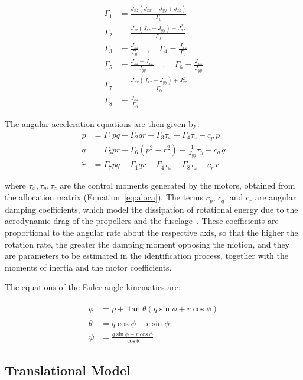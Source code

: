 \documentclass{ieeeaccess}
\begin{document}
\begin{align}
\Gamma_1 &= \frac{J_{xz}(J_{xx} - J_{yy} + J_{zz})}{\Gamma_0} \\
\Gamma_2 &= \frac{J_{zz}(J_{zz} - J_{yy}) + J_{xz}^2}{\Gamma_0} \\
\Gamma_3 &= \frac{J_{zz}}{\Gamma_0} \quad , \quad
\Gamma_4 = \frac{J_{xz}}{\Gamma_0} \\
\Gamma_5 &= \frac{J_{zz} - J_{xx}}{J_{yy}} \quad , \quad
\Gamma_6 = \frac{J_{xz}}{J_{yy}} \\
\Gamma_7 &= \frac{J_{xx}(J_{xx} - J_{yy}) + J_{xz}^2}{\Gamma_0} \\
\Gamma_8 &= \frac{J_{xx}}{\Gamma_0}
\end{align}

The angular acceleration equations are then given by:
\begin{align}
\dot{p} &= \Gamma_1 pq - \Gamma_2 qr + \Gamma_3 \tau_x + \Gamma_4 \tau_z - c_p\, p \\
\dot{q} &= \Gamma_5 pr - \Gamma_6 (p^2 - r^2) + \frac{1}{J_{yy}}\tau_y - c_q\, q \\
\dot{r} &= \Gamma_7 pq - \Gamma_1 qr + \Gamma_4 \tau_x + \Gamma_8 \tau_z - c_r\, r
\end{align}

where $\tau_x, \tau_y, \tau_z$ are the control moments generated by the motors, obtained from the allocation matrix (Equation~\eqref{eq:aloca}). The terms $c_p$, $c_q$, and $c_r$ are angular damping coefficients, which model the dissipation of rotational energy due to the aerodynamic drag of the propellers and the fuselage~\cite{c13}. These coefficients are proportional to the angular rate about the respective axis, so that the higher the rotation rate, the greater the damping moment opposing the motion, and they are parameters to be estimated in the identification process, together with the moments of inertia and the motor coefficients.

The equations of the Euler-angle kinematics are:

\begin{align}
\dot{\phi} &= p + \tan\theta(q\sin\phi + r\cos\phi) \\
\dot{\theta} &= q\cos\phi - r\sin\phi \\
\dot{\psi} &= \frac{q\sin\phi + r\cos\phi}{\cos\theta}
\end{align}

\subsection{Translational Model}
\end{document}
